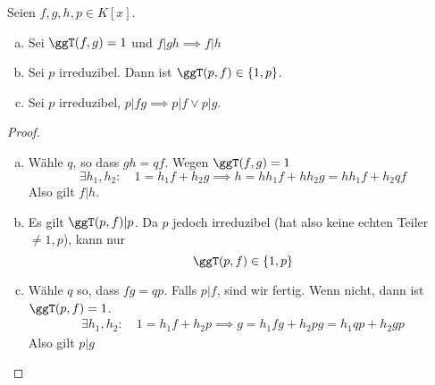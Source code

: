 \documentclass{mycourse}
\begin{document}
\begin{lem}
\label{lem:12.4}
Seien $f,g,h,p\in K[x]$.
\begin{enumerate}[(a)]
\item Sei $\ggT(f,g)=1$ und $f|gh \implies f|h$
\item Sei $p$ irreduzibel.
Dann ist $\ggT(p,f)\in \{1,p\}$.
\item Sei $p$ irreduzibel, $p|fg \implies p|f \lor p|g$.
\end{enumerate}

\begin{proof}
\begin{enumerate}[(a)]
\item Wähle $q$, so dass $gh = qf$.
	Wegen $\ggT(f,g)=1$
\[
\exists h_1,h_2 :\quad 1 = h_1f + h_2g \implies h=hh_1f +hh_2g = hh_1f + h_2qf
\]
Also gilt $f|h$.
\item 
	Es gilt $\ggT(p,f)|p$.
	Da $p$ jedoch irreduzibel (hat also keine echten Teiler $\neq 1, p$), kann nur
	\[
		\ggT(p,f)\in \{1,p\}
	\]
\item 
	Wähle $q$ so, dass $fg=qp$.
	Falls $p|f$, sind wir fertig.
Wenn nicht, dann ist $\ggT(p,f)=1$.
\begin{align*}
	\exists h_1,h_2:\quad 1 =h_1f+h_2p \implies g =h_1fg+h_2pg =h_1qp + h_2g p
\end{align*}
Also gilt $p|g$
\end{enumerate}
\end{proof}
\end{lem}
\end{document}

